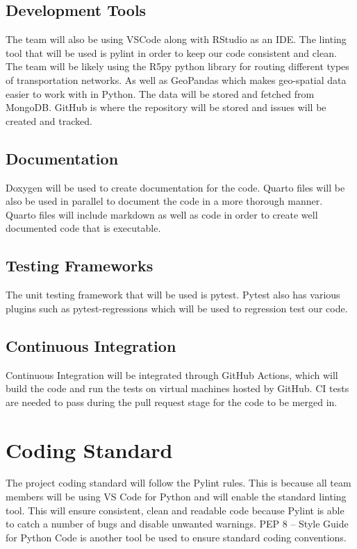 \documentclass{article}
\begin{document}
\subsection{Development Tools}
 The team will also be using VSCode along with RStudio as an IDE. The linting tool that will be used is pylint in order to keep our code consistent and clean. The team will be likely using the R5py python library for routing different types of transportation networks. As well as GeoPandas which makes geo-spatial data easier to work with in Python. The data will be stored and fetched from MongoDB. GitHub is where the repository will be stored and issues will be created and tracked.
 
\subsection{Documentation}
Doxygen will be used to create documentation for the code. Quarto files will be also be used in parallel to document the code in a more thorough manner. Quarto files will include markdown as well as code in order to create well documented code that is executable.

\subsection{Testing Frameworks}
The unit testing framework that will be used is pytest. Pytest also has various plugins such as pytest-regressions which will be used to regression test our code.
 
\subsection{Continuous Integration}
Continuous Integration will be integrated through GitHub Actions, which will build the code and run the tests on virtual machines hosted by GitHub. CI tests are needed to pass during the pull request stage for the code to be merged in.

\section{Coding Standard}
The project coding standard will follow the Pylint rules. This is because all team members will be using VS Code for Python and will enable the standard linting tool. This will ensure consistent, clean and readable code because Pylint is able to catch a number of bugs and disable unwanted warnings. %
PEP 8 – Style Guide for Python Code is another tool be used to ensure standard coding conventions. %
\end{document}
